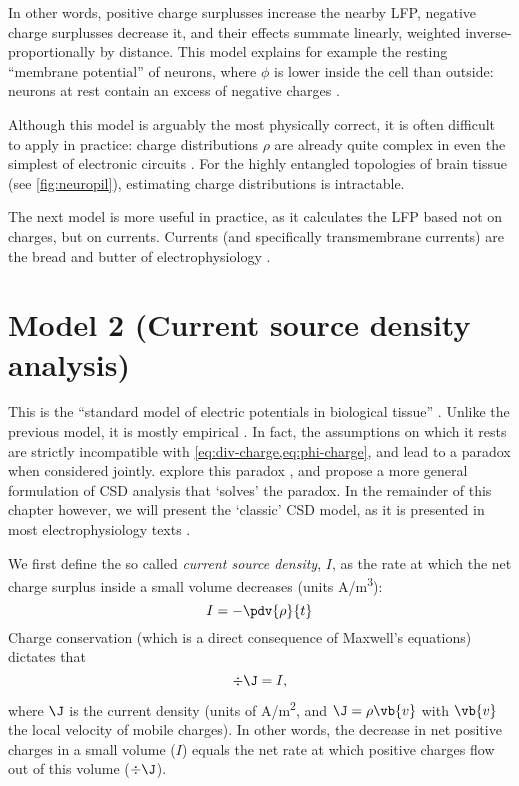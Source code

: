 In other words, positive charge surplusses increase the nearby LFP, negative charge surplusses decrease it, and their effects summate linearly, weighted inverse-proportionally by distance. This model explains for example the resting ``membrane potential'' of neurons, where $\phi$ is lower inside the cell than outside: neurons at rest contain an excess of negative charges \cite{Dayan2001b}.

Although this model is arguably the most physically correct, it is often difficult to apply in practice: charge distributions $\rho$ are already quite complex in even the simplest of electronic circuits \cite[chapter 8]{Chabay2015}. For the highly entangled topologies of brain tissue (see \cref{fig:neuropil}), estimating charge distributions is intractable.

The next model is more useful in practice, as it calculates the LFP based not on charges, but on currents. Currents (and specifically transmembrane currents) are the bread and butter of electrophysiology \cite{Kandel2013a}.




\section{Model 2 (Current source density analysis)}
\label{sec:CSD}

This is the ``standard model of electric potentials in biological tissue'' \cite{Bedard2011}. Unlike the previous model, it is mostly empirical \cite{Bedard2011}. In fact, the assumptions on which it rests are strictly incompatible with \cref{eq:div-charge,eq:phi-charge}, and lead to a paradox when considered jointly.  explore this paradox \cite{Bedard2011}, and propose a more general formulation of CSD analysis that `solves' the paradox. In the remainder of this chapter however, we will present the `classic' CSD model, as it is presented in most electrophysiology texts \cite{Plonsey2007,Nunez2006,Mitzdorf1985,Nicholson1975,Linden2014,Buzsaki2012a}.

We first define the so called \emph{current source density}, $I$, as the rate at which the net charge surplus inside a small volume decreases (units A/\si{m^3}):
%
\begin{equation}
\label{eq:CSD}
I = - \pdv{\rho}{t}
\end{equation}
%
Charge conservation (which is a direct consequence of Maxwell's equations) dictates that
%
\begin{equation}
\label{eq:charge-conservation}
\div{\J} = I,
\end{equation}
%
where $\J$ is the current density (units of A/\si{\metre^2}, and $\J = \rho \vb{v}$ with $\vb{v}$ the local velocity of mobile charges). In other words, the decrease in net positive charges in a small volume ($I$) equals the net rate at which positive charges flow out of this volume ($\div{\J}$).

